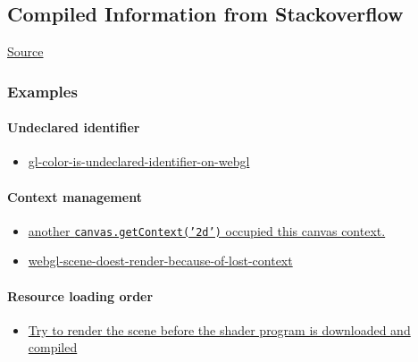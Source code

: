 \documentclass[]{article}
\begin{document}
\subsection{Compiled Information from
Stackoverflow}\label{compiled-information-from-stackoverflow}

\href{http://stackoverflow.com/search?q=WebGL}{Source}

\subsubsection{Examples}\label{examples-1}

\paragraph{Undeclared identifier}\label{undeclared-identifier}

\begin{itemize}
\itemsep1pt\parskip0pt
\item
  \href{http://stackoverflow.com/questions/4468329/gl-color-is-undeclared-identifier-on-webgl}{gl-color-is-undeclared-identifier-on-webgl}
\end{itemize}

\paragraph{Context management}\label{context-management}

\begin{itemize}
\itemsep1pt\parskip0pt
\item
  \href{http://stackoverflow.com/questions/27544729/three-js-error-creating-webgl-context}{another
  \texttt{canvas.getContext('2d')} occupied this canvas context.}
\item
  \href{http://stackoverflow.com/questions/25219352/webgl-scene-doest-render-because-of-lost-context}{webgl-scene-doest-render-because-of-lost-context}
\end{itemize}

\paragraph{Resource loading order}\label{resource-loading-order}

\begin{itemize}
\itemsep1pt\parskip0pt
\item
  \href{http://stackoverflow.com/questions/14943148/webgl-getattriblocation-no-object-shader-issue}{Try
  to render the scene before the shader program is downloaded and
  compiled}
\end{itemize}
\end{document}
